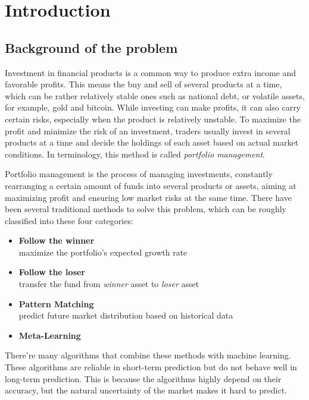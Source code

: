 \documentclass{mcmthesis}
\begin{document}
\section{Introduction}
\subsection{Background of the problem}

 Investment in financial products is a common way to produce extra income and favorable profits.
This means the buy and sell of several products at a time,
which can be rather relatively stable ones such as national debt,
or volatile assets, for example, gold and bitcoin.
While investing can make profits, it can also carry certain risks,
especially when the product is relatively unstable.
To maximize the profit and minimize the risk of an investment,
traders usually invest in several products at a time
and decide the holdings of each asset based on actual market conditions.
In terminology, this method is called \textit{portfolio management}.

Portfolio management is the process of managing investments,
constantly rearranging a certain amount of funds into several products or assets,
aiming at maximizing profit and ensuring low market risks at the same time\cite{jiang2017deep}.
There have been several traditional methods to solve this problem,
which can be roughly classified into these four categories\cite{li2014online}:

\begin{itemize}
  \item \textbf{Follow the winner}\\
  maximize the portfolio's expected growth rate
  \item \textbf{Follow the loser}\\
  transfer the fund from \textit{winner} asset to \textit{loser} asset
  \item \textbf{Pattern Matching}\\
  predict future market distribution based on historical data
  \item \textbf{Meta-Learning}
\end{itemize}

There're many algorithms that combine these methods with machine learning.
These algorithms are reliable in short-term prediction
but do not behave well in long-term prediction.
This is because the algorithms highly depend on their accuracy,
but the natural uncertainty of the market makes it hard to predict.
\end{document}
